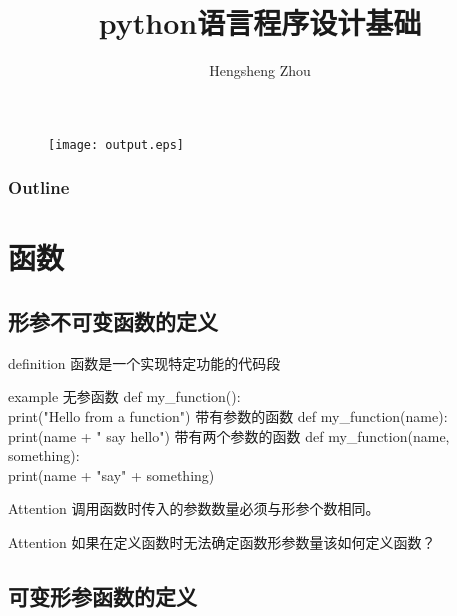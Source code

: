 \documentclass{beamer}
\title{python语言程序设计基础}
\author{Hengsheng Zhou}
\institute{电信与智能制造学院}
\begin{document}
\begin{frame}[t]
	\titlepage
	\begin{figure}
		\begin{center}
			\texttt{[image: output.eps]}
		\end{center}
	\end{figure}


\end{frame}
\begin{frame}
	\frametitle{Outline}
	\tableofcontents
\end{frame}

\section{函数}

\subsection{形参不可变函数的定义}

\begin{frame}[t]
	\begin{block}{definition}
		函数是一个实现特定功能的代码段

	\end{block}
	\pause
	\begin{block}{example}
		无参函数
		def my\_function():\\
		print("Hello from a function")
		带有参数的函数
		def my\_function(name):\\
		print(name + " say hello")
		带有两个参数的函数
		def my\_function(name, something):\\
		print(name + "say" + something)

	\end{block}
	\pause

	\begin{alertblock}{Attention}
		调用函数时传入的参数数量必须与形参个数相同。
	\end{alertblock}
	\pause
	\begin{alertblock}{Attention}
		如果在定义函数时无法确定函数形参数量该如何定义函数？
	\end{alertblock}



\end{frame}
\subsection{可变形参函数的定义}
\end{document}
